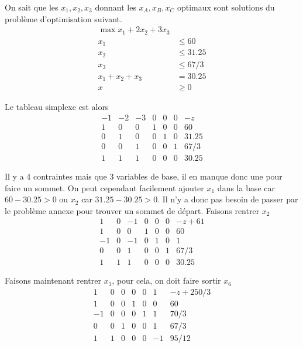 \begin{enumerate}
\begin{solution}
      On sait que les $x_1,x_2,x_3$ donnant les $x_A,x_B,x_C$ optimaux
      sont solutions du problème d'optimisation suivant.
      \begin{align*}
        \max x_1 + 2x_2 + 3x_3\\
        x_1 & \leq 60\\
        x_2 & \leq 31.25\\
        x_3 & \leq 67/3\\
        x_1 + x_2 + x_3 & = 30.25\\
        x & \geq 0
      \end{align*}

      Le tableau simplexe est alors
      \[
        \begin{array}{cccccc|l}
          -1 & -2 & -3 & 0 & 0 & 0 & -z\\
          \hline
          1 & 0 & 0 & 1 & 0 & 0 & 60\\
          0 & 1 & 0 & 0 & 1 & 0 & 31.25\\
          0 & 0 & 1 & 0 & 0 & 1 & 67/3\\
          1 & 1 & 1 & 0 & 0 & 0 & 30.25
        \end{array}
      \]

      Il y a 4 contraintes mais que 3 variables de base, il en manque donc
      une pour faire un sommet.
      On peut cependant facilement ajouter $x_1$ dans la base
      car $60-30.25 > 0$ ou $x_2$ car $31.25-30.25 >0 $.
      Il n'y a donc pas besoin de passer par le problème annexe pour trouver
      un sommet de départ.
      Faisons rentrer $x_2$
      \[
        \begin{array}{cccccc|l}
           1 & 0 & -1 & 0 & 0 & 0 & -z + 61\\
          \hline
           1 & 0 &  0 & 1 & 0 & 0 & 60\\
          -1 & 0 & -1 & 0 & 1 & 0 & 1\\
           0 & 0 &  1 & 0 & 0 & 1 & 67/3\\
           1 & 1 &  1 & 0 & 0 & 0 & 30.25
        \end{array}
      \]

      Faisons maintenant rentrer $x_3$, pour cela, on doit faire sortir $x_6$
      \[
        \begin{array}{cccccc|l}
           1 & 0 & 0 & 0 & 0 &  1 & -z + 250/3\\
          \hline
           1 & 0 & 0 & 1 & 0 &  0 & 60\\
          -1 & 0 & 0 & 0 & 1 &  1 & 70/3\\
           0 & 0 & 1 & 0 & 0 &  1 & 67/3\\
           1 & 1 & 0 & 0 & 0 & -1 & 95/12
        \end{array}
      \]


\end{solution}
\end{enumerate}
